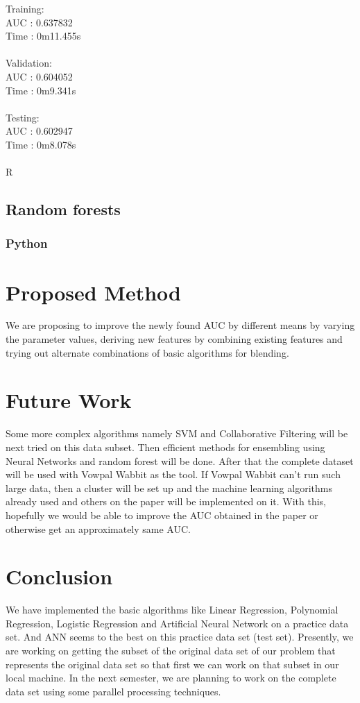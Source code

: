 \documentclass[10pt]{article}
\begin{document}
Training:\\
AUC  : 0.637832\\
Time : 0m11.455s\\\\

Validation:\\
AUC  : 0.604052\\
Time : 0m9.341s\\\\

Testing:\\
AUC  : 0.602947\\
Time : 0m8.078s\\\\
R\\

\subsection{Random forests}
\subsubsection{Python}

\section{Proposed Method}
We are proposing to improve the newly found AUC by different means by varying the parameter values, deriving new features by combining existing features and trying out alternate combinations of basic algorithms for blending.
\section{Future Work}
	Some more complex algorithms namely SVM and Collaborative Filtering will be next tried on this data subset. Then efficient methods for ensembling using Neural Networks and random forest will be done. 
	After that the complete dataset will be used with Vowpal Wabbit as the tool. If Vowpal Wabbit can't run such large data, then a cluster will be set up and the machine learning algorithms already used and others on the paper will be implemented on it. With this, hopefully we would be able to improve the AUC obtained in the paper or otherwise get an approximately same AUC.  

\section{Conclusion}
We have implemented the basic algorithms like Linear Regression, Polynomial Regression, Logistic Regression and Artificial Neural Network on a practice data set. And ANN seems to the best on this practice data set (test set). Presently, we are working on getting the subset of the original data set of our problem that represents the original data set so that first we can work on that subset in our local machine. In the next semester, we are planning to work on the complete data set using some parallel processing techniques.
\end{document}
